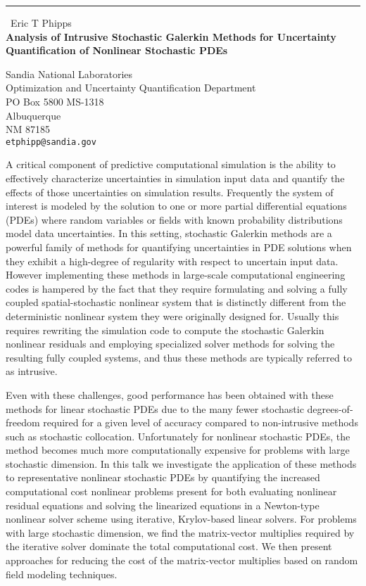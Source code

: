 \documentclass{report}
\begin{document}
\begin{center}
\rule{6in}{1pt} \
{\large Eric T Phipps \\
{\bf Analysis of Intrusive Stochastic Galerkin Methods for Uncertainty Quantification of Nonlinear Stochastic PDEs}}

Sandia National Laboratories \\ Optimization and Uncertainty Quantification Department \\ PO Box 5800 MS-1318 \\ Albuquerque \\ NM 87185
\\
{\tt etphipp@sandia.gov}\end{center}

A critical component of predictive computational simulation is the
ability to effectively characterize uncertainties in simulation input
data and quantify the effects of those uncertainties on simulation
results. Frequently the system of interest is modeled by the solution to
one or more partial differential equations (PDEs) where random variables
or fields with known probability distributions model data uncertainties.
In this setting, stochastic Galerkin methods are a powerful family of
methods for quantifying uncertainties in PDE solutions when they exhibit
a high-degree of regularity with respect to uncertain input data. However
implementing these methods in large-scale computational engineering codes
is hampered by the fact that they require formulating and solving a fully
coupled spatial-stochastic nonlinear system that is distinctly different
from the deterministic nonlinear system they were originally designed
for. Usually this requires rewriting the simulation code to compute the
stochastic Galerkin nonlinear residuals and employing specialized solver
methods for solving the resulting fully coupled systems, and thus these
methods are typically referred to as intrusive.

Even with these challenges, good performance has been obtained with these
methods for linear stochastic PDEs due to the many fewer stochastic
degrees-of-freedom required for a given level of accuracy compared to
non-intrusive methods such as stochastic collocation. Unfortunately for
nonlinear stochastic PDEs, the method becomes much more computationally
expensive for problems with large stochastic dimension. In this talk we
investigate the application of these methods to representative nonlinear
stochastic PDEs by quantifying the increased computational cost nonlinear
problems present for both evaluating nonlinear residual equations and
solving the linearized equations in a Newton-type nonlinear solver scheme
using iterative, Krylov-based linear solvers. For problems with large
stochastic dimension, we find the matrix-vector multiplies required by
the iterative solver dominate the total computational cost. We then
present approaches for reducing the cost of the matrix-vector multiplies
based on random field modeling techniques.
\end{document}
